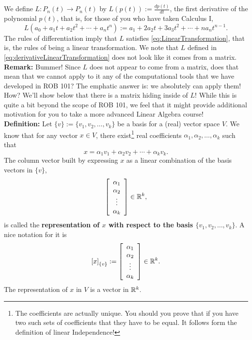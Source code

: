  We define $L:P_n(t) \to P_n(t)$ by $L(p(t)):=\frac{dp(t)}{dt}$, the first derivative of the polynomial $p(t)$, that is, for those of you who have taken Calculus I,
\begin{equation}
    \label{eq:derivativeLinearTransformation}
    L( a_0 + a_1 t + a_2 t^2 + \cdots + a_n t^n):=   a_1  + 2 a_2 t + 3 a_3 t^2 + \cdots + n a_n t^{n-1}.
\end{equation}
 The rules of differentiation imply that $L$ satisfies \eqref{eq:LinearTransformation}, that is, the rules of being a linear transformation. We note that $L$ defined in \eqref{eq:derivativeLinearTransformation} does not look like it comes from a matrix.\\
 
 \textbf{Remark:} Bummer! Since $L$ does not appear to come from a matrix, does that mean that we cannot apply to it any of the computational tools that we have developed in ROB 101? The emphatic answer is: we absolutely can apply them! How? We'll show below that there is a matrix hiding inside of $L$! While this is quite a bit beyond the scope of ROB 101, we feel that it might provide additional motivation for you to take a more advanced Linear Algebra course!\\
 
 \textbf{Definition:} Let $\{v\}:=\{v_1, v_2, \ldots, v_k \}$ be a basis for a (real) vector space $V$. We know that for any vector $x\in V$, there exist\footnote{The coefficients are actually unique. You should you prove that if you have two such sets of coefficients that they have to be equal. It follows form the definition of linear Independence!} real coefficients $\alpha_1, \alpha_2, \ldots, \alpha_k$ such that 
 \begin{equation}
     \label{eq:representationOfVector}
     x = \alpha_1 v_1 +  \alpha_2 v_2 +  \cdots +  \alpha_k v_k.
 \end{equation}
 The column vector built by expressing $x$ as a linear combination of the basis vectors in $\{v\}$,
 \begin{equation}
     \label{eq:representationOfVector02}
    \left[ \begin{array}{c}
\alpha_1 \\ \alpha_2\\ \vdots \\ \alpha_k
\end{array}\right] \in \mathbb R^k,
 \end{equation}
 is called the \textbf{representation of $x$ with respect to the basis $\{v_1, v_2, \ldots, v_k \}$}. A nice notation for it is
  \begin{equation}
     \label{eq:representationOfVector03}
 \left[ x \right]_{\{ v\}} :=  \left[ \begin{array}{c}
\alpha_1 \\ \alpha_2\\ \vdots \\ \alpha_k
\end{array}\right] \in \mathbb R^k.
 \end{equation}
 The representation of $x$ in $V$ is a vector in $\mathbb R^k.$ \\
 
